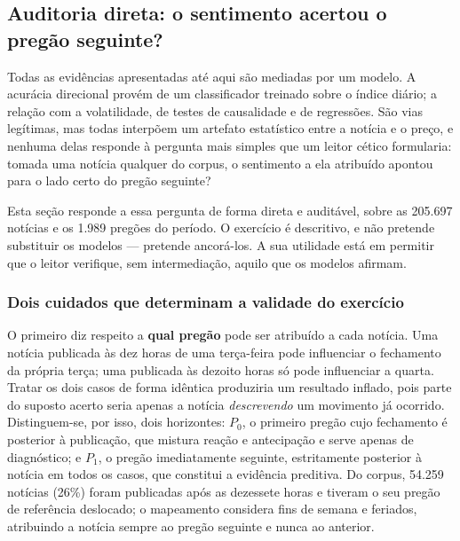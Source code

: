 \subsection{Auditoria direta: o sentimento acertou o pregão seguinte?}
\label{sec:auditoria_noticia}

Todas as evidências apresentadas até aqui são mediadas por um modelo. A acurácia direcional provém
de um classificador treinado sobre o índice diário; a relação com a volatilidade, de testes de
causalidade e de regressões. São vias legítimas, mas todas interpõem um artefato estatístico entre
a notícia e o preço, e nenhuma delas responde à pergunta mais simples que um leitor cético formularia:
tomada uma notícia qualquer do corpus, o sentimento a ela atribuído apontou para o lado certo do
pregão seguinte?

Esta seção responde a essa pergunta de forma direta e auditável, sobre as 205.697 notícias e os 1.989
pregões do período. O exercício é descritivo, e não pretende substituir os modelos --- pretende
ancorá-los. A sua utilidade está em permitir que o leitor verifique, sem intermediação, aquilo que os
modelos afirmam.

\subsubsection{Dois cuidados que determinam a validade do exercício}

O primeiro diz respeito a \textbf{qual pregão} pode ser atribuído a cada notícia. Uma notícia
publicada às dez horas de uma terça-feira pode influenciar o fechamento da própria terça; uma
publicada às dezoito horas só pode influenciar a quarta. Tratar os dois casos de forma idêntica
produziria um resultado inflado, pois parte do suposto acerto seria apenas a notícia \emph{descrevendo}
um movimento já ocorrido. Distinguem-se, por isso, dois horizontes: $P_0$, o primeiro pregão cujo
fechamento é posterior à publicação, que mistura reação e antecipação e serve apenas de diagnóstico;
e $P_1$, o pregão imediatamente seguinte, estritamente posterior à notícia em todos os casos, que
constitui a evidência preditiva. Do corpus, 54.259 notícias (26\%) foram publicadas após as dezessete
horas e tiveram o seu pregão de referência deslocado; o mapeamento considera fins de semana e
feriados, atribuindo a notícia sempre ao pregão seguinte e nunca ao anterior.

